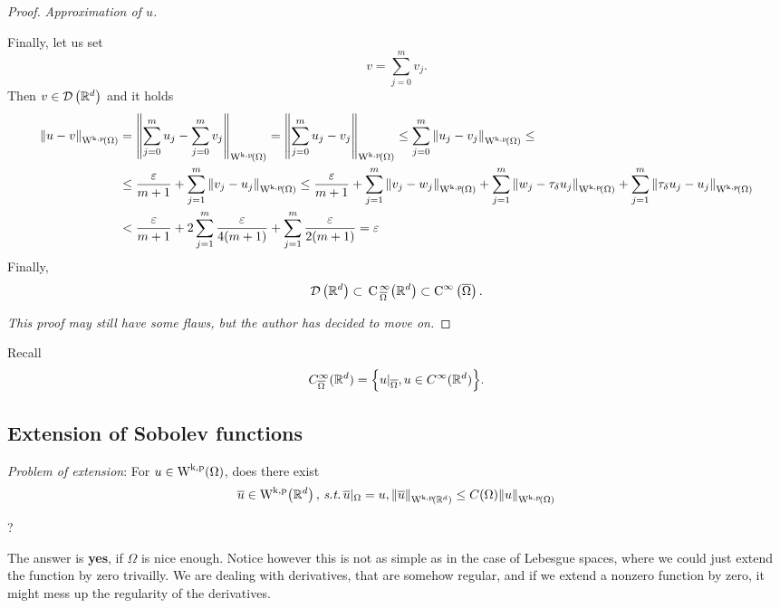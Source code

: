 \documentclass{article}
\begin{document}
\begin{proof}
\textit{Approximation of $u$.}

Finally, let us set
\[
	v = \sum_{j=0}^m v_j.
\]
Then $v \in \mathcal{D}\!\,\left({\mathbb R}^{d} \right)$ and it holds
\begin{align*}
	\norm{u-v}_{\WkpSet{\Omega}} &= \norm{\sum_{j=0}^m u_j- \sum_{j=0}^m v_j}_{\WkpSet{\Omega}} = \norm{\sum_{j=0}^m u_j - v_j}_{\WkpSet{\Omega}} \leq \sum_{j=0}^m \norm{u_j - v_j}_{\WkpSet{\Omega}} \leq \\
	& \leq \frac{\varepsilon}{m+1} + \sum_{j=1}^m \norm{v_j-u_j}_{\WkpSet{\Omega}} \leq \frac{\varepsilon}{m+1} + \sum_{j=1}^m \norm{v_j - w_j}_{\WkpSet{\Omega}} + \sum_{j=1}^m \norm{w_j - \tau_{\delta}u_j}_{\WkpSet{\Omega}} + \sum_{j=1}^m \norm{\tau_{\delta}u_j - u_j}_{\WkpSet{\Omega}}\\
	&< \frac{\varepsilon}{m+1} +  2\sum_{j=1}^m \frac{\varepsilon}{4\qty(m+1)} + \sum_{j=1}^m \frac{\varepsilon}{2\qty(m+1)} = \varepsilon
\end{align*}
Finally,
\[
	\mathcal{D}\!\,\left({\mathbb R}^{d} \right) \subset \, \text{C} \,^{\infty}_{\overline{\Omega}}\qty({\mathbb R}^{d}) \subset \text{C}^{\infty}\!\,\left(\overline{\Omega} \right).
\]

\textit{This proof may still have some flaws, but the author has decided to move on.}
\end{proof}	

\begin{remark}
	Recall
	\[
		C^\infty_{\overline{\Omega}}({\mathbb R}^d) = \Big\{u|_{\overline{\Omega}}, u \in C^{\infty}({\mathbb R}^d) \Big\}.
	\]
\end{remark}



\subsection{Extension of Sobolev functions}
\label{sec:extension}

\textit{Problem of extension}: For $u \in \WkpSet{\Omega}$, does there exist
\[
	\overline{u} \in \WkpSet{\R^d}, \, \text{\textit{s.t.}} \,\overline{u}|_{\Omega}=u, \norm{\overline{u}}_{\WkpSet{\R^d}} \leq C(\Omega) \norm{u}_{\WkpSet{\Omega}}
\]

?

The answer is \textbf{yes}, if $\Omega$ is nice enough. Notice however this is not as simple as in the case of Lebesgue spaces, where we could just extend the function by zero trivailly. We are dealing with derivatives, that are somehow regular, and if we extend a nonzero function by zero, it might mess up the regularity of the derivatives.
\end{document}
